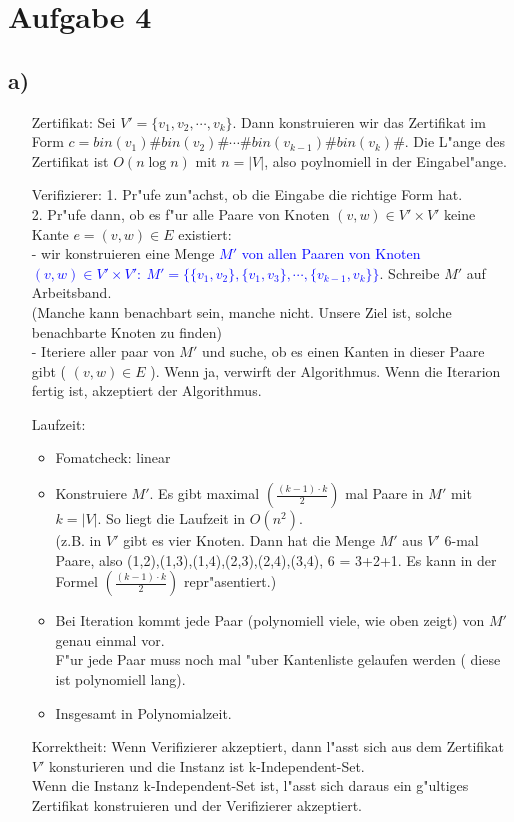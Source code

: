 \documentclass[a4paper,11pt]{scrartcl}
\begin{document}
	
\section*{Aufgabe 4}
\subsection*{a)}
\begin{itemize}
	\item[Zertifikat:] Sei $V'=\{v_1,v_2,\cdots ,v_k\}$. Dann konstruieren wir das Zertifikat im Form $c=bin(v_1)\# bin(v_2)\# \cdots \# bin(v_{k-1})\# bin(v_k)\#$. Die L"ange des Zertifikat ist $O(n \log n)$ mit $n=|V|$, also poylnomiell in der Eingabel"ange.
	\item [Verifizierer:] 1. Pr"ufe zun"achst, ob die Eingabe die richtige Form hat.\\
	2. Pr"ufe dann, ob es f"ur alle Paare von Knoten $(v,w)\in V'\times V'$ keine Kante $e=(v,w)\in E$ existiert:\\
	- wir konstruieren eine Menge \textcolor{blue}{$M'$ von allen Paaren von Knoten $(v,w)\in V' \times V':\ M'=\{\{v_1,v_2\},\{v_1,v_3\},\cdots,\{v_{k-1},v_{k}\}\}$}. Schreibe $M'$ auf Arbeitsband.\\ (Manche kann benachbart sein, manche nicht. Unsere Ziel ist, solche benachbarte Knoten zu finden)\\
	- Iteriere aller paar von $M'$ und suche, ob es einen Kanten in dieser Paare gibt ( $(v,w)\in E$ ). Wenn ja, verwirft der Algorithmus. Wenn die Iterarion fertig ist, akzeptiert der Algorithmus.
	\item [Laufzeit:]
	\begin{itemize}
		\item Fomatcheck: linear
		\item Konstruiere $M'$. Es gibt maximal $(\frac{(k-1)\cdot k}{2})$ mal Paare in $M'$ mit $k=|V|$. So liegt die Laufzeit in $O(n^2)$. \\
		(z.B. in $V'$ gibt es vier Knoten. Dann hat die Menge $M'$ aus $V'$ 6-mal Paare, also (1,2),(1,3),(1,4),(2,3),(2,4),(3,4), 6 = 3+2+1. Es kann in der Formel $(\frac{(k-1)\cdot k}{2})$ repr"asentiert.)
		\item Bei Iteration kommt jede Paar (polynomiell viele, wie oben zeigt) von $M'$ genau einmal vor.\\
		F"ur jede Paar muss noch mal "uber Kantenliste gelaufen werden ( diese ist polynomiell lang).
		\item Insgesamt in Polynomialzeit.
	\end{itemize}


	\item[Korrektheit:] Wenn Verifizierer akzeptiert, dann l"asst sich aus dem Zertifikat $V'$ konsturieren und die Instanz ist k-Independent-Set.\\
	Wenn die Instanz k-Independent-Set ist, l"asst sich daraus ein g"ultiges Zertifikat konstruieren und der Verifizierer akzeptiert.
\end{itemize}
\end{document}
